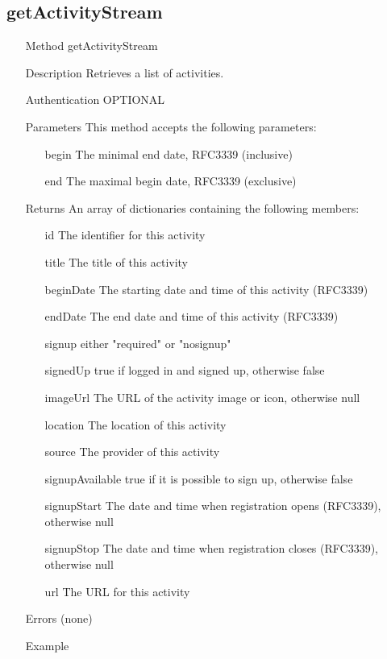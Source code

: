\documentclass[a4paper]{scrreprt}
\begin{document}
\subsection{getActivityStream}
\begin{enumerate}
\item[Method] getActivityStream
\item[Description] Retrieves a list of activities.
\item[Authentication] OPTIONAL
\item[Parameters] This method accepts the following parameters:
\begin{enumerate}
	\item[begin] The minimal end date, RFC3339 (inclusive)
    \item[end] The maximal begin date, RFC3339 (exclusive)
    \end{enumerate}
\item[Returns] An array of dictionaries containing the following members:
\begin{enumerate}
    \item[id] The identifier for this activity
    \item[title] The title of this activity
    \item[beginDate] The starting date and time of this activity (RFC3339)
    \item[endDate] The end date and time of this activity (RFC3339)
    \item[signup] either "required" or "nosignup"
    \item[signedUp] true if logged in and signed up, otherwise false
    \item[imageUrl] The URL of the activity image or icon, otherwise null
    \item[location] The location of this activity
    \item[source] The provider of this activity
    \item[signupAvailable] true if it is possible to sign up, otherwise false
    \item[signupStart] The date and time when registration opens (RFC3339), otherwise null
    \item[signupStop] The date and time when registration closes (RFC3339), otherwise null
    \item[url] The URL for this activity
	\end{enumerate}
\item[Errors] (none)
\clearpage
\item[Example]

\end{enumerate}
\end{document}
